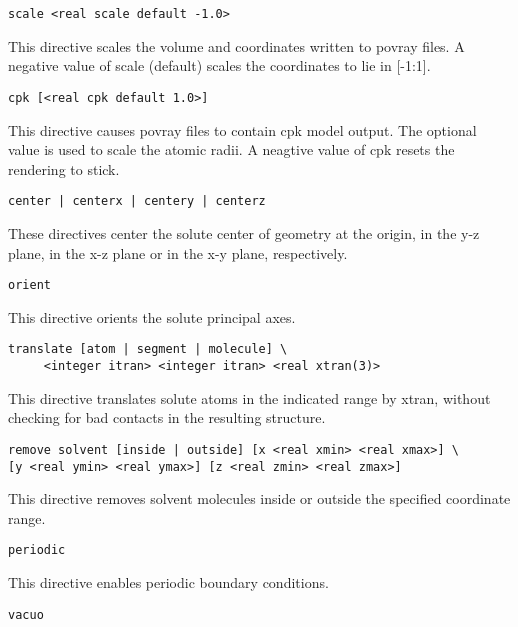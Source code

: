 \begin{verbatim}
scale <real scale default -1.0>
\end{verbatim}

This directive scales the volume and coordinates written to povray files.
A negative value of scale (default) scales the coordinates to lie
in [-1:1].

\begin{verbatim}
cpk [<real cpk default 1.0>]
\end{verbatim}

This directive causes povray files to contain cpk model output. The
optional value is used to scale the atomic radii. A neagtive value
of cpk resets the rendering to stick.

\begin{verbatim}
center | centerx | centery | centerz
\end{verbatim}

These directives center the solute center of geometry at the origin,
in the y-z plane, in the x-z plane or in the x-y plane, respectively.

\begin{verbatim}
orient
\end{verbatim}

This directive orients the solute principal axes.

\begin{verbatim}
translate [atom | segment | molecule] \
	 <integer itran> <integer itran> <real xtran(3)>
\end{verbatim}

This directive translates solute atoms in the indicated range by xtran,
without checking for bad contacts in the resulting structure.

\begin{verbatim}
remove solvent [inside | outside] [x <real xmin> <real xmax>] \
[y <real ymin> <real ymax>] [z <real zmin> <real zmax>]
\end{verbatim}

This directive removes solvent molecules inside or outside the
specified coordinate range.

\begin{verbatim}
periodic
\end{verbatim}

This directive enables periodic boundary conditions.

\begin{verbatim}
vacuo
\end{verbatim}

